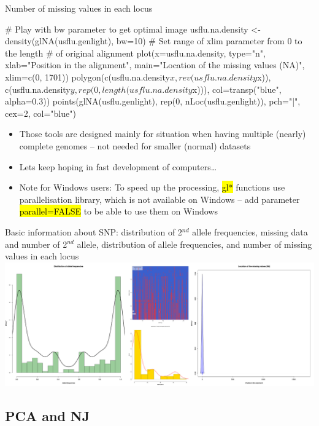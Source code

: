 \documentclass[compress, ucs, xelatex, 11pt, xcolor=svgnames,
  hyperref={
    bookmarks=true,
    unicode=true,
    colorlinks=true,
    pdftitle={Molecular data in R},
    plainpages=false,
    pdfauthor={Vojtech Zeisek},
    pdfsubject={Course about phylogeny and evolution in R},
    pdfcreator={XeLaTeX},
    pdfkeywords={R, evolution, phylogeny, molecular data},
    linkcolor=Tomato,
    anchorcolor=SaddleBrown,
    citecolor=Goldenrod,
    filecolor=DarkMagenta,
    menucolor=Sienna,
    urlcolor=DarkTurquoise,
    pdftex},
  url={hyphens, lowtilde} %
  ]{beamer}
\renewcommand{\texttt}[1]{\hl{\ttfamily #1}}
\begin{document}
\begin{frame}[fragile]{Number of missing values in each locus}
  \begin{spluscode}
    # Play with bw parameter to get optimal image
    usflu.na.density <- density(glNA(usflu.genlight), bw=10)
    # Set range of xlim parameter from 0 to the length
    # of original alignment
    plot(x=usflu.na.density, type="n", xlab="Position in the alignment",
      main="Location of the missing values (NA)", xlim=c(0, 1701))
    polygon(c(usflu.na.density$x, rev(usflu.na.density$x)),
      c(usflu.na.density$y, rep(0, length(usflu.na.density$x))),
      col=transp("blue", alpha=0.3))
    points(glNA(usflu.genlight), rep(0, nLoc(usflu.genlight)), 
      pch="|", cex=2, col="blue")
  \end{spluscode}
  \begin{itemize}
    \item Those tools are designed mainly for situation when having multiple (nearly) complete genomes -- not needed for smaller (normal) datasets
    \item Lets keep hoping in fast development of computers\ldots
    \item \alert{Note for Windows users:} To speed up the processing, \texttt{gl*} functions use parallelisation library, which is not available on Windows -- add parameter \texttt{parallel=FALSE} to be able to use them on Windows
  \end{itemize}
\end{frame}

\begin{frame}{Basic information about SNP: distribution of 2$^{nd}$ allele frequencies, missing data and number of 2$^{nd}$ allele, distribution of allele frequencies, and number of missing values in each locus}
  \includegraphics[width=\textwidth]{flu_alleles.png}
\end{frame}

\subsection{PCA and NJ}
\end{document}
